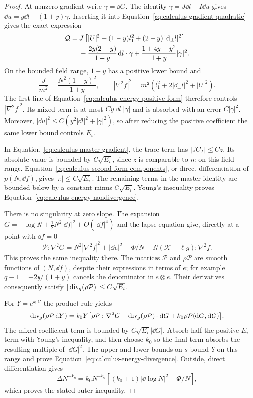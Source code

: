 \begin{proof}
At nonzero gradient write $\gamma=\dd G$.  The identity
$\gamma=J\dd l-I\dd u$ gives
$\dd u=y\dd l-(1+y)\gamma$.
Inserting it into Equation~\eqref{eq:calculus-gradient-quadratic}
gives the exact expression
\begin{align}
 \mathcal Q={}&J\left[|U|^2+(1-y)l_1^2
                                  +(2-y)|\mathop{}\!\mathrm d_\perp l|^2\right]\notag\\
 &-\frac{2y(2-y)}{1+y}\mathop{}\!\mathrm d l\cdot\gamma
          +\frac{1+4y-y^2}{1+y}|\gamma|^2.
 \label{eq:calculus-energy-positive-form}
\end{align}
On the bounded field range, $1-y$ has a positive lower bound and
\[
 \frac J{m^2}=\frac{N^2(1-y)^2}{1+y},\qquad
 |\nabla^2f|^2=m^2(l_1^2+2|\dd_\perp l|^2+|U|^2).
\]
The first line of Equation~\eqref{eq:calculus-energy-positive-form}
therefore controls $|\nabla^2f|^2$.  Its mixed term is at most
$Cy|\dd l||\gamma|$ and is absorbed with an error $C|\gamma|^2$.
Moreover,
$|\dd u|^2\le C(y^2|\dd l|^2+|\gamma|^2)$, so after reducing the
positive coefficient the same lower bound controls $E_i$.

In Equation~\eqref{eq:calculus-master-gradient}, the trace term has
$|JC_T|\le C z$.  Its absolute value is bounded by
$C\sqrt{E_i}$, since $z$ is comparable to $m$ on this field range.
Equation~\eqref{eq:calculus-second-form-components}, or direct
differentiation of $p(N,\dd f)$, gives
$|\pi|\le C\sqrt{E_i}$.
The remaining terms in the master identity are bounded below by a
constant minus $C\sqrt{E_i}$.  Young's inequality proves
Equation~\eqref{eq:calculus-energy-nondivergence}.

There is no singularity at zero slope.  The expansion
$G=-\log N+\tfrac12N^2|\dd f|^2+O(|\dd f|^4)$ and the lapse equation
give, directly at a point with $\dd f=0$,
\[
 \mathcal P:\nabla^2G
 =N^2|\nabla^2f|^2+|\dd u|^2-\Phi/N
                    -N(\mathcal K+\ell g):\nabla^2f.
\]
This proves the same inequality there.  The matrices
$\mathcal P$ and $\rho\mathcal P$ are smooth functions of
$(N,\dd f)$, despite their expressions in terms of $e$; for example
$q-1=-2y/(1+y)$ cancels the denominator in $e\otimes e$.
Their derivatives consequently satisfy
$|\operatorname{div}_g(\rho\mathcal P)|\le C\sqrt{E_i}$.

For $Y=e^{k_0G}$ the product rule yields
\begin{align*}
 \operatorname{div}_g(\rho\mathcal P\mathop{}\!\mathrm d Y)
 =k_0Y\bigl[\rho\mathcal P:\nabla^2G
      +\operatorname{div}_g(\rho\mathcal P)\cdot\mathop{}\!\mathrm d G
      +k_0\rho\mathcal P(\mathop{}\!\mathrm d G,\mathop{}\!\mathrm d G)\bigr].
\end{align*}
The mixed coefficient term is bounded by $C\sqrt{E_i}|\dd G|$.
Absorb half the positive $E_i$ term with Young's inequality, and then
choose $k_0$ so the final term absorbs the resulting multiple of
$|\dd G|^2$.  The upper and lower bounds on $s$ bound $Y$ on this
range and prove Equation~\eqref{eq:calculus-energy-divergence}.
Outside, direct differentiation gives
\[
 \Delta N^{-k_0}=k_0N^{-k_0}
          \left[(k_0+1)|\dd\log N|^2-\Phi/N\right],
\]
which proves the stated outer inequality.


\end{proof}
